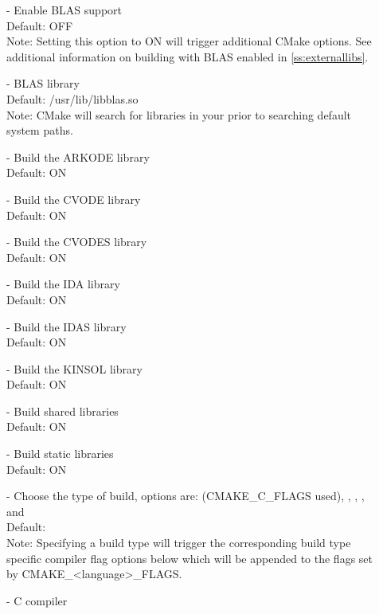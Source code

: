 \begin{description}
\item[] -
  Enable BLAS support
  \\
  Default: OFF
  \\
  Note: Setting this option to ON will trigger additional CMake
  options. See additional information on building with BLAS enabled
  in \ref{ss:externallibs}.
\item[] -
  BLAS library
  \\
  Default: /usr/lib/libblas.so
  \\
  Note: CMake will search for libraries in your  prior
  to searching default system paths.
\item[] -
  Build the ARKODE library
  \\
  Default: ON
\item[] -
  Build the CVODE library
  \\
  Default: ON
\item[] -
  Build the CVODES library
  \\
  Default: ON
\item[] -
   Build the IDA library
  \\
   Default: ON
\item[] -
  Build the IDAS library
  \\
  Default: ON
\item[] -
  Build the KINSOL library
  \\
  Default: ON
\item[] -
  Build shared libraries
  \\
  Default: ON
\item[] -
  Build static libraries
  \\
  Default: ON
\item[] -
  Choose the type of build, options are:
   (CMAKE\_C\_FLAGS used), , ,
  , and 
  \\
  Default:
  \\
  Note: Specifying a build type will trigger the corresponding
  build type specific compiler flag options below which will be
  appended to the flags set by
  CMAKE\_{\textless}language{\textgreater}\_FLAGS.
\item[] -
  C compiler
  \\

\end{description}
